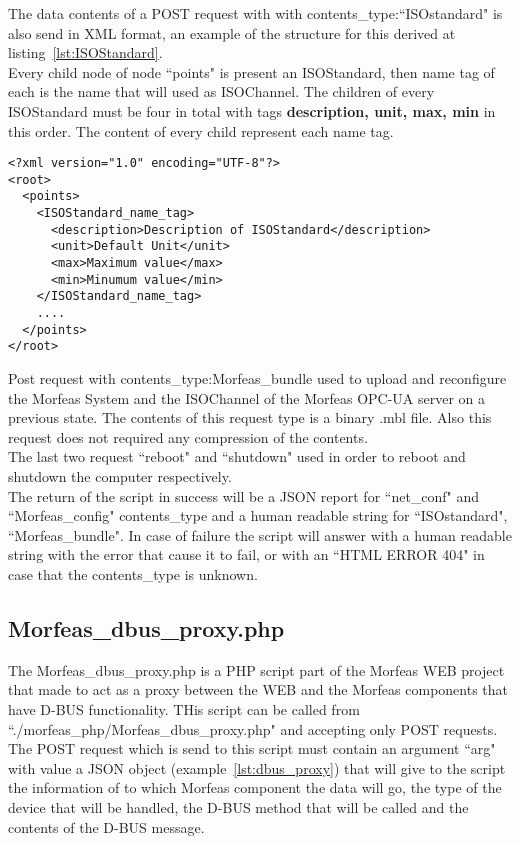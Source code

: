 The data contents of a POST request with with contents\_type:``ISOstandard" is also send in XML format, an example of the structure for this derived at listing~\ref{lst:ISOStandard}.\\
Every child node of node ``points" is present an ISOStandard, then name tag of each is the name that will used as ISOChannel. The children of every ISOStandard must be four in total
with tags \textbf{description, unit, max, min} in this order. The content of every child represent each name tag.

\begin{lstlisting}[frame=single,caption=Structure of contents for POST request with ``contents\_type:ISOstandard",label=lst:ISOStandard]
<?xml version="1.0" encoding="UTF-8"?>
<root>
  <points>
    <ISOStandard_name_tag>
      <description>Description of ISOStandard</description>
      <unit>Default Unit</unit>
      <max>Maximum value</max>
      <min>Minumum value</min>
    </ISOStandard_name_tag>
    ....
  </points>
</root>
\end{lstlisting}

Post request with contents\_type:Morfeas\_bundle used to upload and reconfigure the Morfeas System and the ISOChannel of the Morfeas OPC-UA server on a previous state.
The contents of this request type is a binary .mbl file. Also this request does not required any compression of the contents.\\

The last two request ``reboot" and ``shutdown" used in order to reboot and shutdown the computer respectively.\\

The return of the script in success will be a JSON report for ``net\_conf" and ``Morfeas\_config" contents\_type and a human readable string for ``ISOstandard", ``Morfeas\_bundle".
In case of failure the script will answer with a human readable string with the error that cause it to fail, or with an ``HTML ERROR 404" in case that the contents\_type is unknown.

\subsection{Morfeas\_dbus\_proxy.php}
The Morfeas\_dbus\_proxy.php is a PHP script part of the Morfeas WEB project that made to act as a proxy between the WEB and the Morfeas components that have D-BUS functionality.
THis script can be called from ``./morfeas\_php/Morfeas\_dbus\_proxy.php" and accepting only POST requests. The POST request which is send to this script must contain an argument ``arg"
with value a JSON object (example~\ref{lst:dbus_proxy}) that will give to the script the information of to which Morfeas component the data will go,
the type of the device that will be handled, the D-BUS method that will be called and the contents of the D-BUS message.

